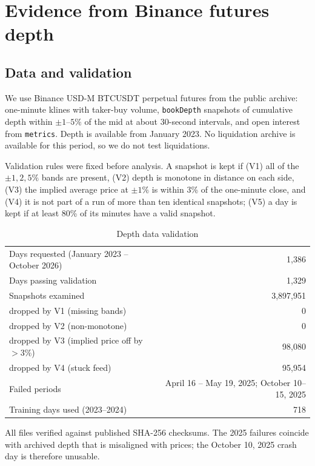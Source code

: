\section{Evidence from Binance futures depth}\label{sec:depth}

\subsection{Data and validation}
We use Binance USD-M BTCUSDT perpetual futures from the public archive: one-minute klines with taker-buy volume, \texttt{bookDepth} snapshots of cumulative depth within $\pm1$--$5\%$ of the mid at about 30-second intervals, and open interest from \texttt{metrics}. Depth is available from January 2023. No liquidation archive is available for this period, so we do not test liquidations.

Validation rules were fixed before analysis. A snapshot is kept if (V1) all of the $\pm1,2,5\%$ bands are present, (V2) depth is monotone in distance on each side, (V3) the implied average price at $\pm1\%$ is within 3\% of the one-minute close, and (V4) it is not part of a run of more than ten identical snapshots; (V5) a day is kept if at least 80\% of its minutes have a valid snapshot.

\begin{table}[t]\centering\small
\begin{threeparttable}
\caption{Depth data validation}\label{tab:d2}
\begin{tabular}{lr}
\toprule
Days requested (January 2023 -- October 2026) & 1{,}386\\
Days passing validation & 1{,}329\\
Snapshots examined & 3{,}897{,}951\\
\quad dropped by V1 (missing bands) & 0\\
\quad dropped by V2 (non-monotone) & 0\\
\quad dropped by V3 (implied price off by $>3\%$) & 98{,}080\\
\quad dropped by V4 (stuck feed) & 95{,}954\\
Failed periods & April 16 -- May 19, 2025; October 10--15, 2025\\
Training days used (2023--2024) & 718\\
\bottomrule
\end{tabular}
\begin{tablenotes}\footnotesize\item All files verified against published SHA-256 checksums. The 2025 failures coincide with archived depth that is misaligned with prices; the October 10, 2025 crash day is therefore unusable. \end{tablenotes}
\end{threeparttable}
\end{table}

